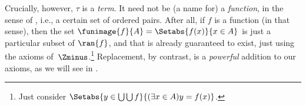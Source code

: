 \documentclass[../../../include/open-logic-section]{subfiles}
\begin{document}
Crucially, however, $\tau$ is a \emph{term}. It need not be (a name
for) a \emph{function}, in the sense of ,
i.e., a certain set of ordered pairs. After all, if $f$ is a function
(in that sense), then the set $\funimage{f}{A} = \Setabs{f(x)}{x \in
A}$ is just a particular subset of $\ran{f}$, and that is already
guaranteed to exist, just using the axioms of~$\Zminus$.\footnote{Just
consider $\Setabs{y \in \bigcup \bigcup f}{(\exists x \in A)y =
f(x)}$.} Replacement, by contrast, is a \emph{powerful} addition to
our axioms, as we will see in .
\end{document}
